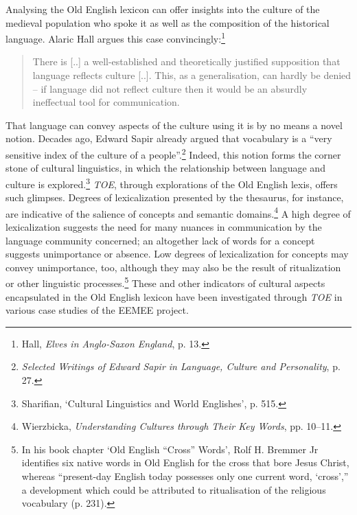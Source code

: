 Analysing the Old English lexicon can offer insights into the culture of the medieval population who spoke it as well as the composition of the historical language. Alaric Hall argues this case convincingly:\footnote{Hall, \textit{Elves in Anglo-Saxon England}, p. 13.}
\begin{quote} \noindent
There is [..] a well-established and theoretically justified supposition that language reflects culture [..]. This, as a generalisation, can hardly be denied – if language did not reflect culture then it would be an absurdly ineffectual tool for communication.
\end{quote}
That language can convey aspects of the culture using it is by no means a novel notion. Decades ago, Edward Sapir already argued that vocabulary is a ``very sensitive index of the culture of a people''.\footnote{\textit{Selected Writings of Edward Sapir in Language, Culture and Personality}, p. 27.} Indeed, this notion forms the corner stone of cultural linguistics, in which the relationship between language and culture is explored.\footnote{Sharifian, ‘Cultural Linguistics and World Englishes’, p. 515.} \textit{TOE}, through explorations of the Old English lexis, offers such glimpses. Degrees of lexicalization presented by the thesaurus, for instance, are indicative of the salience of concepts and semantic domains.\footnote{Wierzbicka, \textit{Understanding Cultures through Their Key Words}, pp. 10–11.} A high degree of lexicalization suggests the need for many nuances in communication by the language community concerned; an altogether lack of words for a concept suggests unimportance or absence. Low degrees of lexicalization for concepts may convey unimportance, too, although they may also be the result of ritualization or other linguistic processes.\footnote{In his book chapter `Old English ``Cross'' Words', Rolf H. Bremmer Jr identifies six native words in Old English for the cross that bore Jesus Christ, %
whereas ``present-day English today possesses only one current word, `cross','' a development which could be attributed to ritualisation of the religious vocabulary (p. 231).} 
These and other indicators of cultural aspects encapsulated in the Old English lexicon have been investigated through \textit{TOE} in various case studies of the EEMEE project.

